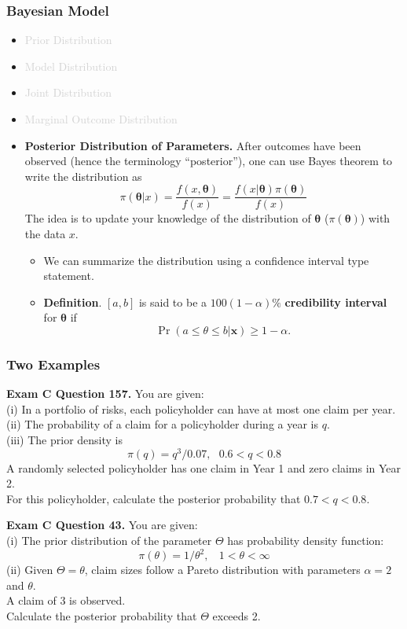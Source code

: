 \documentclass{beamer}
\begin{document}
\begin{frame}[shrink=.22]
\frametitle{Bayesian Model}
\begin{itemize}
\item \textcolor{lightgray}{Prior Distribution}
\item \textcolor{lightgray}{Model Distribution}
\item \textcolor{lightgray}{Joint Distribution}
\item \textcolor{lightgray}{Marginal Outcome Distribution}
\item \textbf{Posterior Distribution of Parameters.} After outcomes have been observed (hence the terminology ``posterior''), one can use Bayes theorem to write the distribution as
$$ \pi(\boldsymbol \theta | x) =\frac{f(x , \boldsymbol \theta)}{f(x)} =\frac{f(x|\boldsymbol \theta )\pi(\boldsymbol \theta)}{f(x)} $$
The idea is to update your knowledge of the distribution of $\boldsymbol \theta$ ($\pi(\boldsymbol \theta)$) with the data $x$.
\begin{itemize}
\item We can summarize the distribution using a confidence interval type statement.
\item\textbf{Definition}. $[a,b]$ is said to be a $100(1-\alpha)\%$ \textbf{credibility interval} for $\boldsymbol \theta$  if
$$\Pr (a \le \theta \le b | \mathbf{x}) \ge 1- \alpha.$$
\end{itemize}
\end{itemize}
\end{frame}



\begin{frame}[shrink=2]
\frametitle{Two Examples}

\noindent\textbf{Exam C Question 157.} You are given: \\
(i) In a portfolio of risks, each policyholder can have at most one claim per year. \\
(ii) The probability of a claim for a policyholder during a year is $q$. \\
(iii) The prior density is
$$ \pi(q) = q^3/0.07, \ \ \ 0.6 < q < 0.8$$
A randomly selected policyholder has one claim in Year 1 and zero claims in Year 2. \\
For this policyholder, calculate the posterior probability that $0.7 < q < 0.8$.

\bigskip

\noindent\textbf{Exam C Question 43.} You are given: \\
(i) The prior distribution of the parameter $\Theta$ has probability density function:
$$ \pi(\theta) = 1/\theta^2, \ \ \ \ 1 < \theta < \infty$$
(ii) Given $\Theta = \theta$, claim sizes follow a Pareto distribution with parameters $\alpha=2$ and $\theta$.\\
A claim of 3 is observed.\\
Calculate the posterior probability that $\Theta$ exceeds 2.

\end{frame}
\end{document}
